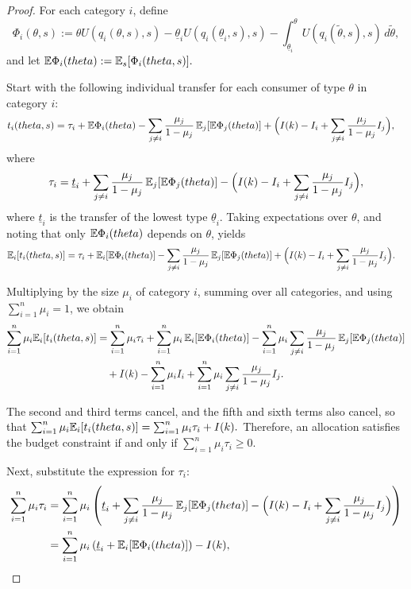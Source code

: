 \documentclass{class}
\begin{document}
\begin{proof}

For each category $i$, define
\[
\Phi_i(\theta,s)
:=
\theta U\!\left(q_i(\theta,s),s\right)
- \underline\theta_i U\!\left(q_i(\underline\theta_i,s),s\right)
- \int_{\underline{\theta}_i}^{\theta}
U\!\left(q_i(\tilde\theta,s),s\right)\,d\tilde\theta,
\]
and let
$\mathbb{E}\Phi_i(theta) := \mathbb{E}_s[\Phi_i(theta,s)].$

Start with the following individual transfer for each consumer of type $\theta$ in category $i$:
\begin{align*}
t_i(theta,s)
&=
\tau_i
+ \mathbb{E}\Phi_i(theta)
- \sum_{j\neq i}  \frac{\mu_j}{1-\mu_j}\,
   \mathbb{E}_j[\mathbb{E}\Phi_j(theta)] + \Big(I(k) -I_i+\sum_{j\neq i}  \frac{\mu_j}{1-\mu_j}I_j\Big),
\end{align*}
where
\[
\tau_i
=
\underline t_i
+\sum_{j\neq i}  \frac{\mu_j}{1-\mu_j}\,
   \mathbb{E}_j[\mathbb{E}\Phi_j(theta)]
- \Big(I(k) -I_i+\sum_{j\neq i}  \frac{\mu_j}{1-\mu_j}I_j\Big),
\]
where $\underline t_i$ is the transfer of the lowest type $\underline{\theta}_i$. Taking expectations over $\theta$, and noting that only $\mathbb{E}\Phi_i(theta)$ depends on $\theta$, yields
\begin{align*}
\mathbb{E}_i[t_i(theta,s)]
&=
\tau_i
+ \mathbb{E}_i[\mathbb{E}\Phi_i(theta)]
- \sum_{j\neq i}  \frac{\mu_j}{1-\mu_j}\,
   \mathbb{E}_j[\mathbb{E}\Phi_j(theta)] 
+ \Big(I(k) -I_i+\sum_{j\neq i}  \frac{\mu_j}{1-\mu_j}I_j\Big).
\end{align*}

Multiplying by the size $\mu_i$ of category $i$, summing over all categories, and using $\sum_{i=1}^n\mu_i = 1$, we obtain
\begin{align*}
\sum_{i=1}^n \mu_i\mathbb{E}_i[t_i(theta,s)]
&=
\sum_{i=1}^n \mu_i \tau_i
+ \sum_{i=1}^n\mu_i\,\mathbb{E}_i[\mathbb{E}\Phi_i(theta)]-\sum_{i=1}^n\mu_i\sum_{j\neq i} \frac{\mu_j}{1-\mu_j}\,
   \mathbb{E}_j[\mathbb{E}\Phi_j(theta)]
\\
&\quad
+ I(k)
-\sum_{i=1}^n\mu_iI_i
+\sum_{i=1}^n\mu_i\sum_{j\neq i}  \frac{\mu_j}{1-\mu_j}I_j.
\end{align*}

The second and third terms cancel, and the fifth and sixth terms also cancel, so that
$\sum_{i=1}^n \mu_i\mathbb{E}_i[t_i(theta,s)] = \sum_{i=1}^n \mu_i \tau_i + I(k).$
Therefore, an allocation satisfies the budget constraint if and only if $\sum_{i=1}^n \mu_i \tau_i \geq 0$.

Next, substitute the expression for $\tau_i$:
\begin{align*}
\sum_{i=1}^n \mu_i \tau_i &= \sum_{i=1}^n \mu_i \left( \underline t_i + \sum_{j\neq i} \frac{\mu_j}{1-\mu_j}\, \mathbb{E}_j[\mathbb{E}\Phi_j(theta)] - \Big(I(k) - I_i + \sum_{j\neq i} \frac{\mu_j}{1-\mu_j} I_j\Big) \right) \\
&= \sum_{i=1}^n \mu_i \left( \underline t_i + \mathbb{E}_i[\mathbb{E}\Phi_i(theta)] \right) - I(k),
\end{align*}


\end{proof}
\end{document}
